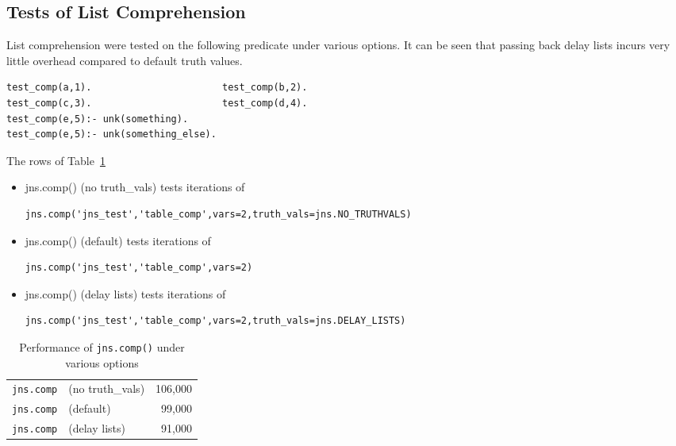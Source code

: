 \subsection{Tests of List Comprehension}
List comprehension were tested on the following predicate under
various options.  It can be seen that passing back delay lists incurs
very little overhead compared to default truth values.
\begin{verbatim}
test_comp(a,1).                       test_comp(b,2).
test_comp(c,3).                       test_comp(d,4).
test_comp(e,5):- unk(something).
test_comp(e,5):- unk(something_else).
\end{verbatim}
The rows of Table~\ref{table:janus-py-comp}
\begin{itemize}   
\item jns.comp() (no truth\_vals) tests iterations of 
\begin{verbatim}
jns.comp('jns_test','table_comp',vars=2,truth_vals=jns.NO_TRUTHVALS)
\end{verbatim}
\item jns.comp() (default) tests iterations of 
\begin{verbatim}
jns.comp('jns_test','table_comp',vars=2)
\end{verbatim}
\item jns.comp() (delay lists) tests iterations of 
\begin{verbatim}
jns.comp('jns_test','table_comp',vars=2,truth_vals=jns.DELAY_LISTS)
\end{verbatim}
\end{itemize}

\begin{table}[hbt] \label{table:janus-py-comp}
  \begin{centering}
\begin{tabular}{llr} \hline
{\tt jns.comp}            & (no truth\_vals)  &    106,000\\
{\tt jns.comp}            & (default)         &     99,000\\
{\tt jns.comp}            & (delay lists)     &     91,000\\ \hline
\end{tabular}        
\caption{Performance of {\tt jns.comp()} under various options}
  \end{centering}
\end{table}

